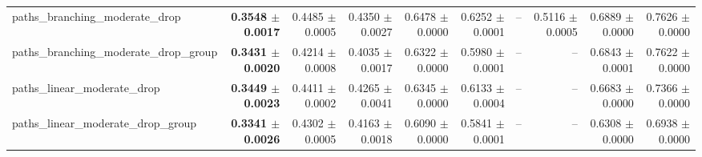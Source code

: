 \begin{tabular}{@{}lrrrrrrrrr@{}}
paths\_branching\_moderate\_drop & \textbf{0.3548 $\pm$ 0.0017} & 0.4485 $\pm$ 0.0005 & 0.4350 $\pm$ 0.0027 & 0.6478 $\pm$ 0.0000 & 0.6252 $\pm$ 0.0001 & -- & 0.5116 $\pm$ 0.0005 & 0.6889 $\pm$ 0.0000 & 0.7626 $\pm$ 0.0000 \\
paths\_branching\_moderate\_drop\_group & \textbf{0.3431 $\pm$ 0.0020} & 0.4214 $\pm$ 0.0008 & 0.4035 $\pm$ 0.0017 & 0.6322 $\pm$ 0.0000 & 0.5980 $\pm$ 0.0001 & -- & -- & 0.6843 $\pm$ 0.0001 & 0.7622 $\pm$ 0.0000 \\
paths\_linear\_moderate\_drop & \textbf{0.3449 $\pm$ 0.0023} & 0.4411 $\pm$ 0.0002 & 0.4265 $\pm$ 0.0041 & 0.6345 $\pm$ 0.0000 & 0.6133 $\pm$ 0.0004 & -- & -- & 0.6683 $\pm$ 0.0000 & 0.7366 $\pm$ 0.0000 \\
paths\_linear\_moderate\_drop\_group & \textbf{0.3341 $\pm$ 0.0026} & 0.4302 $\pm$ 0.0005 & 0.4163 $\pm$ 0.0018 & 0.6090 $\pm$ 0.0000 & 0.5841 $\pm$ 0.0001 & -- & -- & 0.6308 $\pm$ 0.0000 & 0.6938 $\pm$ 0.0000 \\
\bottomrule
\end{tabular}
